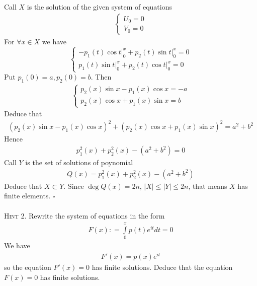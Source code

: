 \documentclass{article}
\begin{document}
Call $X$ is the solution of the given system of equations 
\begin{align}
	\left\{ {\begin{array}{*{20}{c}}
			{{U_0} = 0}\\
			{{V_0} = 0}
	\end{array}} \right.
\end{align}
For $\forall x \in X$ we have
\begin{equation}
	\left\{ {\begin{array}{*{20}{c}}
			{ - {p_1}\left( t \right)\left. {\cos t} \right|_0^x + {p_2}\left( t \right)\left. {\sin t} \right|_0^x = 0}\\
			{{p_1}\left( t \right)\left. {\sin t} \right|_0^x + {p_2}\left( t \right)\left. {\cos t} \right|_0^x = 0}
	\end{array}} \right.
\end{equation}
Put ${p_1}\left( 0 \right) = a,{p_2}\left( 0 \right) = b$. Then 
\begin{align}
	\left\{ {\begin{array}{*{20}{c}}
			{{p_2}\left( x \right)\sin x - {p_1}\left( x \right)\cos x =  - a}\\
			{{p_2}\left( x \right)\cos x + {p_1}\left( x \right)\sin x = b}
	\end{array}} \right.
\end{align}
Deduce that
\begin{align}
	{\left( {{p_2}\left( x \right)\sin x - {p_1}\left( x \right)\cos x} \right)^2} + {\left( {{p_2}\left( x \right)\cos x + {p_1}\left( x \right)\sin x} \right)^2} = {a^2} + {b^2}
\end{align}
Hence
\begin{align}
	p_1^2\left( x \right) + p_2^2\left( x \right) - \left( {{a^2} + {b^2}} \right) = 0
\end{align}
Call $Y$ is the set of solutions of poynomial
\begin{align}
	Q\left( x \right) = p_1^2\left( x \right) + p_2^2\left( x \right) - \left( {{a^2} + {b^2}} \right)
\end{align}
Deduce that $X \subset Y$. Since $\deg Q\left( x \right) = 2n$, $\left| X \right| \le \left| Y \right| \le 2n$, that means $X$ has finite elements. \hfill $\square$\\
\\
\textsc{Hint 2.} Rewrite the system of equations in the form
\begin{align}
	F\left( x \right): = \int\limits_0^x {p\left( t \right){e^{it}}dt}  = 0
\end{align}
We have
\begin{align}
	F'\left( x \right) = p\left( x \right){e^{it}}
\end{align}
so the equation $F'\left( x \right) = 0$ has finite solutions. Deduce that the equation $F\left( x \right) = 0$ has finite solutions.
\end{document}
